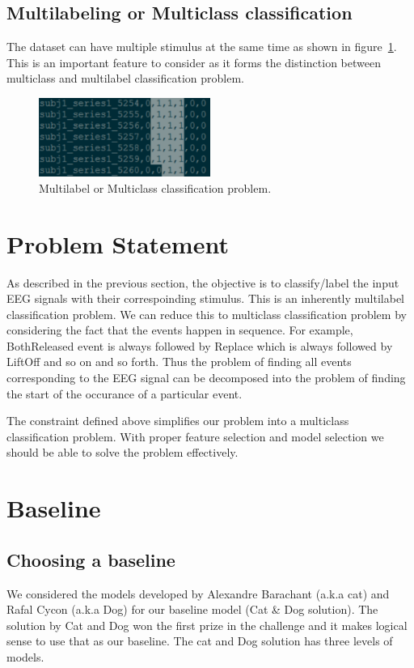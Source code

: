 \documentclass[final,leqno,onefignum,onetabnum]{siamltexmm}
\begin{document}
\subsection{Multilabeling or Multiclass classification}
The dataset can have multiple stimulus at the same time as shown in figure~\ref{fig:label_or_class}.
This is an important feature to consider as it forms the distinction between multiclass and multilabel classification problem.
\begin{figure}[ht!]
  \centering
  \includegraphics[width=0.5\textwidth]{images/multilabels}
  \caption{Multilabel or Multiclass classification problem.\label{fig:label_or_class}}
\end{figure}

\section{Problem Statement}
As described in the previous section, the objective is to classify/label the input EEG signals with their correspoinding stimulus.  
This is an inherently multilabel classification problem.  
We can reduce this to multiclass classification problem by considering the fact that the events happen in sequence.  
For example, BothReleased event is always followed by Replace which is always followed by LiftOff and so on and so forth.
Thus the problem of finding all events corresponding to the EEG signal can be decomposed into the problem of finding the start of the occurance of a particular event.

The constraint defined above simplifies our problem into a multiclass classification problem.  With proper feature selection and model selection we should be able to solve the problem effectively.

\section{Baseline}
\subsection{Choosing a baseline}
We considered the models developed by Alexandre Barachant (a.k.a cat) and Rafal Cycon (a.k.a Dog) for our baseline model (Cat \& Dog solution)\cite{website:cat_dog_solution}.  
The solution by Cat and Dog won the first prize in the challenge and it makes logical sense to use that as our baseline.   
The cat and Dog solution has three levels of models.
\end{document}
